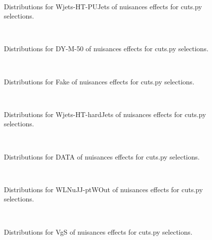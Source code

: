 \begin{figure}[htbp]  
\centering 
\\ 
\caption{ 
   Distributions for Wjets-HT-PUJets of nuisances effects for cuts.py selections.
} 
\label{fig:Wjets_HT_PUJets_cuts.py} 
\end{figure} 




\begin{figure}[htbp]  
\centering 
\\ 
\caption{ 
   Distributions for DY-M-50 of nuisances effects for cuts.py selections.
} 
\label{fig:DY_M-50_cuts.py} 
\end{figure} 




\begin{figure}[htbp]  
\centering 
\\ 
\caption{ 
   Distributions for Fake of nuisances effects for cuts.py selections.
} 
\label{fig:Fake_cuts.py} 
\end{figure} 




\begin{figure}[htbp]  
\centering 
\\ 
\caption{ 
   Distributions for Wjets-HT-hardJets of nuisances effects for cuts.py selections.
} 
\label{fig:Wjets_HT_hardJets_cuts.py} 
\end{figure} 




\begin{figure}[htbp]  
\centering 
\\ 
\caption{ 
   Distributions for DATA of nuisances effects for cuts.py selections.
} 
\label{fig:DATA_cuts.py} 
\end{figure} 




\begin{figure}[htbp]  
\centering 
\\ 
\caption{ 
   Distributions for WLNuJJ-ptWOut of nuisances effects for cuts.py selections.
} 
\label{fig:WLNuJJ_ptWOut_cuts.py} 
\end{figure} 




\begin{figure}[htbp]  
\centering 
\\ 
\caption{ 
   Distributions for VgS of nuisances effects for cuts.py selections.
} 
\label{fig:VgS_cuts.py} 
\end{figure} 


